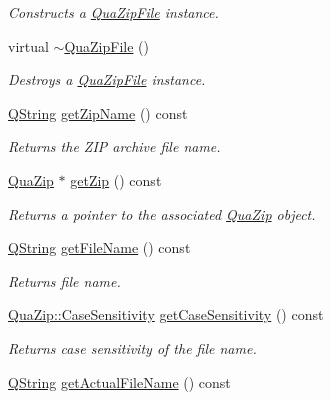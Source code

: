\begin{DoxyCompactItemize}
\begin{DoxyCompactList}\small\item\em Constructs a \hyperlink{class_qua_zip_file}{Qua\-Zip\-File} instance. \end{DoxyCompactList}\item 
virtual \hyperlink{class_qua_zip_file_aa1e5a0cf491bafae6cc73e649caa97fc}{$\sim$\-Qua\-Zip\-File} ()
\begin{DoxyCompactList}\small\item\em Destroys a \hyperlink{class_qua_zip_file}{Qua\-Zip\-File} instance. \end{DoxyCompactList}\item 
\hyperlink{group___u_a_v_objects_plugin_gab9d252f49c333c94a72f97ce3105a32d}{Q\-String} \hyperlink{class_qua_zip_file_a6f034a714aa94631367590de3f8f4e22}{get\-Zip\-Name} () const 
\begin{DoxyCompactList}\small\item\em Returns the Z\-I\-P archive file name. \end{DoxyCompactList}\item 
\hyperlink{class_qua_zip}{Qua\-Zip} $\ast$ \hyperlink{class_qua_zip_file_abba38eaa52178120ee1f840c86026637}{get\-Zip} () const 
\begin{DoxyCompactList}\small\item\em Returns a pointer to the associated \hyperlink{class_qua_zip}{Qua\-Zip} object. \end{DoxyCompactList}\item 
\hyperlink{group___u_a_v_objects_plugin_gab9d252f49c333c94a72f97ce3105a32d}{Q\-String} \hyperlink{class_qua_zip_file_a6999362e70a5b2396fba5cfb30095ff9}{get\-File\-Name} () const 
\begin{DoxyCompactList}\small\item\em Returns file name. \end{DoxyCompactList}\item 
\hyperlink{class_qua_zip_a6053a1d249ed210a85c9d5eb7cf9cdbe}{Qua\-Zip\-::\-Case\-Sensitivity} \hyperlink{class_qua_zip_file_a25dbfddc589bf6b69b39905f3c3bcc73}{get\-Case\-Sensitivity} () const 
\begin{DoxyCompactList}\small\item\em Returns case sensitivity of the file name. \end{DoxyCompactList}\item 
\hyperlink{group___u_a_v_objects_plugin_gab9d252f49c333c94a72f97ce3105a32d}{Q\-String} \hyperlink{class_qua_zip_file_a7b8e3c39026855cd98661a1b2815c220}{get\-Actual\-File\-Name} () const 

\end{DoxyCompactItemize}
